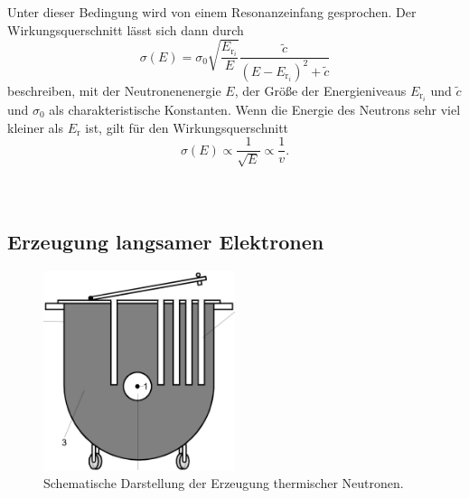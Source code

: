 Unter dieser Bedingung wird von einem Resonanzeinfang gesprochen.
Der Wirkungsquerschnitt lässt sich dann durch
\begin{equation*}
    \sigma(E) = \sigma_0 \sqrt{\frac{E_{\text{r}_i}}{E}} \frac{\tilde{c}}{(E-E_{\text{r}_i})^2 + \tilde{c}}
\end{equation*}
beschreiben, mit der Neutronenenergie $E$, der Größe der Energieniveaus $E_{\text{r}_i}$ und $\tilde{c}$ und $\sigma_0$ als charakteristische Konstanten.
Wenn die Energie des Neutrons sehr viel kleiner als $E_{\text{r}}$ ist, gilt für den Wirkungsquerschnitt
\begin{equation*}
    \sigma(E) \propto \frac{1}{\sqrt{E}} \propto \frac{1}{v}.
\end{equation*}
\\
\\
\subsection{Erzeugung langsamer Elektronen}
\label{subsec:Erzeugung langsamer Elektronen}

\begin{figure}
    \centering
    \includegraphics[width=0.5\textwidth]{img/Neutronenquelle.jpg}
    \caption{Schematische Darstellung der Erzeugung thermischer Neutronen. \cite{V702}}
    \label{fig:Neutronenquelle}
\end{figure}

